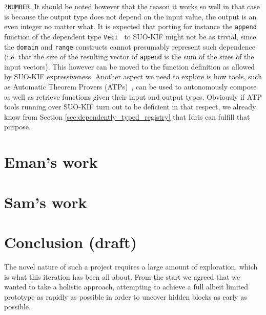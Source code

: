 \documentclass[]{report}
\begin{document}
\begin{itemize}
\texttt{?NUMBER}.  It should be noted however that the reason it works
so well in that case is because the output type does not depend on the
input value, the output is an even integer no matter what.  It is
expected that porting for instance the \texttt{append} function of
the dependent type \texttt{Vect}~\cite{Vectors} to SUO-KIF might not
be as trivial, since the \texttt{domain} and \texttt{range} constructs
cannot presumably represent such dependence (i.e. that the size of
the resulting vector of \texttt{append} is the sum of the sizes of the input vectors).  This however can be
moved to the function definition as allowed by SUO-KIF expressiveness.
Another aspect we need to explore is how tools, such as Automatic
Theorem Provers (ATPs)~\cite{Baumgartner_automatedreasoning,
  Urban_anoverview, Alvez_evaluating_atp_adimen_SUMO}, can be used to
autonomously compose as well as retrieve functions given their input
and output types.  Obviously if ATP tools running over SUO-KIF turn
out to be deficient in that respect, we already know from Section
\ref{sec:dependently_typed_registry} that Idris can fulfill that purpose.
\end{itemize}

\chapter{Eman's work}

\chapter{Sam's work}

\chapter{Conclusion (draft)}

The novel nature of such a project requires a large amount of
exploration, which is what this iteration has been all about.  From
the start we agreed that we wanted to take a holistic approach, attempting
to achieve a full albeit limited prototype as rapidly as possible in
order to uncover hidden blocks as early as possible.
\end{document}

